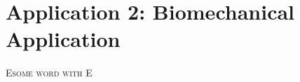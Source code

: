 
\chapter{Application 2: Biomechanical Application}

\lettrine{E}{some word with E}
\blindtext{}





\cleardoublepage
